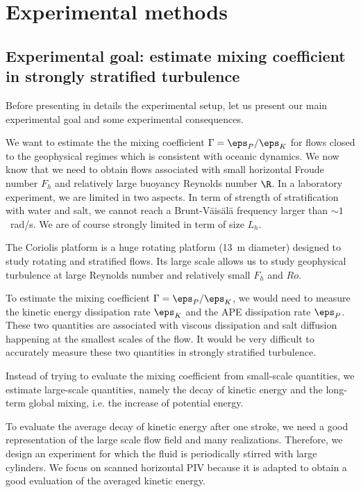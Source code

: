 \section{Experimental methods}

\subsection{Experimental goal: estimate mixing coefficient in strongly
stratified turbulence}

Before presenting in details the experimental setup, let us present our main
experimental goal and some experimental consequences.

We want to estimate the the mixing coefficient $\Gamma = \eps_P/\eps_K$ for
flows closed to the geophysical regimes which is consistent with oceanic
dynamics. We now know \cite{BrethouwerBillantLindborg2007, Maffioli2016} that
we need to obtain flows associated with small horizontal Froude number $F_h$
and relatively large buoyancy Reynolds number $\R$. In a laboratory experiment,
we are limited in two aspects. In term of strength of stratification with water
and salt, we cannot reach a Brunt-V\"ais\"al\"a frequency larger than
$\sim1$~rad/s. We are of course strongly limited in term of size $L_h$.

The Coriolis platform is a huge rotating platform (13~m
diameter) designed to study rotating and stratified flows. Its large scale
allows us to study geophysical turbulence at large Reynolds number and
relatively small $F_h$ and $Ro$.

To estimate the mixing coefficient $\Gamma = \eps_P/\eps_K$, we would need to
measure the kinetic energy dissipation rate $\eps_K$ and the APE dissipation
rate $\eps_P$. These two quantities are associated with viscous dissipation and
salt diffusion happening at the smallest scales of the flow. It would be very
difficult to accurately measure these two quantities in strongly stratified
turbulence.

Instead of trying to evaluate the mixing coefficient from small-scale
quantities, we estimate large-scale quantities, namely the decay of kinetic
energy and the long-term global mixing, i.e. the increase of potential energy.

To evaluate the average decay of kinetic energy after one stroke, we need a
good representation of the large scale flow field and many realizations.
Therefore, we design an experiment for which the fluid is periodically stirred
with large cylinders. We focus on scanned horizontal PIV because it is adapted
to obtain a good evaluation of the averaged kinetic energy.

